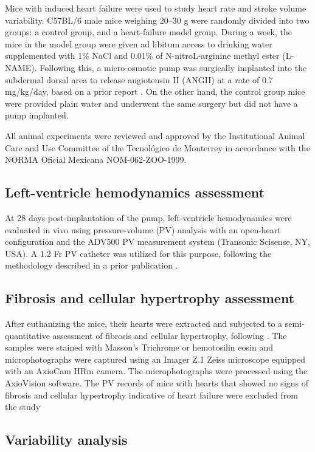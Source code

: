 \documentclass[%
preprint,
 amsmath,amssymb,
 aps,
]{revtex4-2}
\begin{document}
Mice with induced heart failure were used to study heart rate and stroke volume variability. C57BL/6 male mice weighing 20–30 g were randomly divided into two groups: a control group, and a heart-failure model group. During a week, the mice in the model group were given ad libitum access to drinking water supplemented with 1\% NaCl and 0.01\% of N-nitroL-arginine methyl ester (L-NAME). Following this, a micro-osmotic pump was surgically implanted into the subdermal dorsal area to release angiotensin II (ANGII) at a rate of 0.7 mg/kg/day, based on a prior report \citep{Ruiz_Esparza_2016}. On the other hand, the control group mice were provided plain water and underwent the same surgery but  did not have a pump implanted.

All animal experiments were reviewed and approved by the Institutional Animal Care and Use Committee of the Tecnológico de Monterrey in accordance with the NORMA Oficial Mexicana NOM-062-ZOO-1999. 

\subsection{Left-ventricle hemodynamics assessment}

At 28 days post-implantation of the pump, left-ventricle hemodynamics were evaluated in vivo using pressure-volume (PV) analysis with an open-heart configuration and the ADV500 PV measurement system (Transonic Scisense, NY, USA). A 1.2 Fr PV catheter was utilized for this purpose, following the methodology described in a prior publication \citep{Pacher_2008}.

\subsection{Fibrosis and cellular hypertrophy assessment}

After euthanizing the mice, their hearts were extracted and subjected to a semi-quantitative assessment of fibrosis and cellular hypertrophy, following \citet{Ruiz_Esparza_2016}. The samples were stained with Masson’s Trichrome or hemotosilin eosin and microphotographs were captured using an Imager Z.1 Zeiss microscope equipped with an AxioCam HRm camera. The microphotographs were processed using the AxioVision software. The PV records of mice with hearts that showed no signs of fibrosis and cellular hypertrophy indicative of heart failure were excluded from the study

\subsection{Variability analysis}
\end{document}
